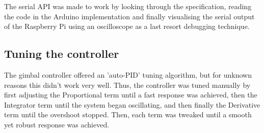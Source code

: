 The serial API was made to work by looking through the specification, reading the code in the Arduino implementation and finally visualising the serial output of the Raspberry Pi using an oscilloscope as a last resort debugging technique.

\subsection{Tuning the controller}
The gimbal controller offered an 'auto-PID' tuning algorithm, but for unknown reasons this didn't work very well. Thus, the controller was tuned manually by first adjusting the Proportional term until a fast response was achieved, then the Integrator term until the system began oscillating, and then finally the Derivative term until the overshoot stopped. Then, each term was tweaked until a smooth yet robust response was achieved.


